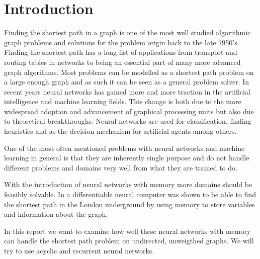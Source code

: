 
\section{Introduction}
Finding the shortest path in a graph is one of the most well studied algorithmic graph problems and solutions for the problem origin back to the late 1950's. Finding the shortest path has a long list of applications from transport and routing tables in networks to being an essential part of many more advanced graph algorithms. Most problems can be modelled as a shortest path problem on a large enough graph and as such it can be seen as a general problem solver. In recent years neural networks has gained more and more traction in the artificial intelligence and machine learning fields. This change is both due to the more widespread adoption and advancement of graphical processing units but also due to theoretical breakthroughs. Neural networks are used for classification, finding heuristics and as the decision mechanism for artificial agents among others.

\newpar One of the most often mentioned problems with neural networks and machine learning in general is that they are inherently single purpose and do not handle different problems and domains very well from what they are trained to do.

\newpar With the introduction of neural networks with memory more domains should be feasibly solvable. In \cite{graves2016hybrid} a differentiable neural computer was shown to be able to find the shortest path in the London underground by using memory to store variables and information about the graph.

\newpar In this report we want to examine how well these neural networks with memory can handle the shortest path problem on undirected, unweigthed graphs. We will try to use acyclic and recurrent neural networks.